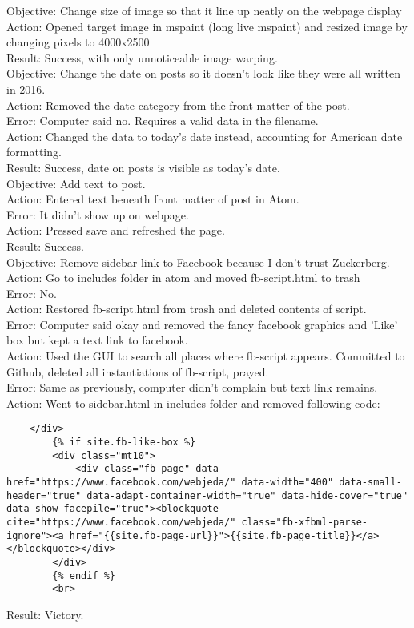 \documentclass{article}
\begin{document}
Objective: Change size of image so that it line up neatly on the webpage display\\
Action: Opened target image in mspaint (long live mspaint) and resized image by changing pixels to 4000x2500\\
Result: Success, with only unnoticeable image warping.\\

Objective: Change the date on posts so it doesn't look like they were all written in 2016.\\ 
Action: Removed the date category from the front matter of the post.\\
Error: Computer said no. Requires a valid data in the filename.\\
Action: Changed the data to today's date instead, accounting for American date formatting.\\
Result: Success, date on posts is visible as today's date.\\

Objective: Add text to post.\\
Action: Entered text beneath front matter of post in Atom.\\
Error: It didn't show up on webpage.\\
Action: Pressed save and refreshed the page.\\
Result: Success.\\

Objective: Remove sidebar link to Facebook because I don't trust Zuckerberg.\\
Action: Go to includes folder in atom and moved fb-script.html to trash\\
Error: No.\\
Action: Restored fb-script.html from trash and deleted contents of script.\\
Error: Computer said okay and removed the fancy facebook graphics and 'Like' box but kept a text link to facebook.\\
Action: Used the GUI to search all places where fb-script appears. Committed to Github, deleted all instantiations of fb-script, prayed.\\
Error: Same as previously, computer didn't complain but text link remains.\\
Action: Went to sidebar.html in includes folder and removed following code: 
\begin{verbatim}
    </div>
        {% if site.fb-like-box %}
        <div class="mt10">
            <div class="fb-page" data-href="https://www.facebook.com/webjeda/" data-width="400" data-small-header="true" data-adapt-container-width="true" data-hide-cover="true" data-show-facepile="true"><blockquote cite="https://www.facebook.com/webjeda/" class="fb-xfbml-parse-ignore"><a href="{{site.fb-page-url}}">{{site.fb-page-title}}</a></blockquote></div>
        </div>
        {% endif %}
        <br>
\end{verbatim}
Result: Victory.
\end{document}
